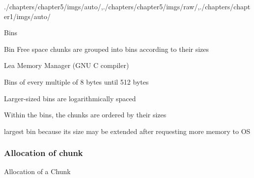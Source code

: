 \begin{graphicspathcontext}{{./chapters/chapter5/imgs/auto/},{./chapters/chapter5/imgs/raw/},{./chapters/chapter1/imgs/auto/}}
\begin{bibunit}[apalike]
\begin{frame}{Bins}
	\begin{definitionblock}{Bin}
		Free space chunks are grouped into bins according to their sizes
	\end{definitionblock}
	\vspace{.2cm}
	\vspace{.2cm}
	\begin{alertblock}{Lea Memory Manager (GNU C compiler)}
		\begin{description}
			\item Bins of every multiple of 8 bytes until 512 bytes
			\item Larger-sized bins are logarithmically spaced
			\item Within the bins, the chunks are ordered by their sizes
			\item[Wilderness chunk] largest bin because its size may be extended after requesting more memory to OS
		\end{description}
	\end{alertblock}
\end{frame}

\subsubsection{Allocation of chunk}
\subsubsectiontableofcontentslide

\begin{frame}{Allocation of a Chunk}
	\begin{small}
		\begin{myalgorithm}
			\BlankLine
		\end{myalgorithm}
	\end{small}
\end{frame}


\end{bibunit}
\end{graphicspathcontext}
